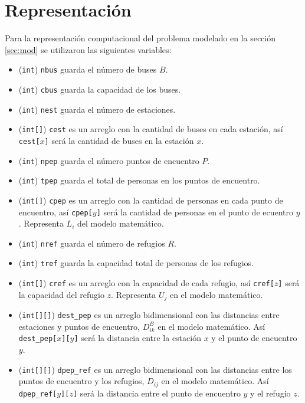 \documentclass[letter, 10pt]{article}
\begin{document}
\section{Representación}\label{sec:repr}
    Para la representación computacional del problema modelado en la sección
    \ref{sec:mod} se utilizaron las siguientes variables:
    \begin{itemize}
        \item (\texttt{int}) \texttt{nbus} guarda el número de buses $B$.
        \item (\texttt{int}) \texttt{cbus} guarda la capacidad de los buses.
        \item (\texttt{int}) \texttt{nest} guarda el número de estaciones.
        \item (\texttt{int[]}) \texttt{cest} 
            es un arreglo con la cantidad de buses en cada estación, así
            \texttt{cest[$x$]} será la cantidad de buses en la estación $x$.
        \item (\texttt{int}) \texttt{npep}
            guarda el número puntos de encuentro $P$.
        \item (\texttt{int}) \texttt{tpep} 
            guarda el total de personas en los puntos de encuentro.
        \item (\texttt{int[]}) \texttt{cpep}
            es un arreglo con la cantidad de personas en cada punto de
            encuentro, así \texttt{cpep[$y$]} será la cantidad de personas en el
            punto de ecuentro $y$. Representa $L_i$ del modelo matemático.
        \item (\texttt{int}) \texttt{nref} guarda el número de refugios $R$.
        \item (\texttt{int}) \texttt{tref}
            guarda la capacidad total de personas de los refugios.
        \item (\texttt{int[]}) \texttt{cref}
            es un arreglo con la capacidad de cada refugio, así
            \texttt{cref[$z$]} será la capacidad del refugio $z$. Representa
            $U_j$ en el modelo matemático.
        \item (\texttt{int[][]}) \texttt{dest\_pep}
            es un arreglo bidimensional con las distancias entre estaciones y
            puntos de encuentro, $D^{B}_{ik}$ en el modelo matemático. Así
            \texttt{dest\_pep[$x$][$y$]} será la distancia entre la estación $x$
            y el punto de encuentro $y$.
        \item (\texttt{int[][]}) \texttt{dpep\_ref}
            es un arreglo bidimensional con las distancias entre los puntos de
            encuentro y los refugios, $D_{ij}$ en el modelo matemático. Así
            \texttt{dpep\_ref[$y$][$z$]} será la distancia entre el punto de
            encuentro $y$ y el refugio $z$.
    \end{itemize}
\end{document}
